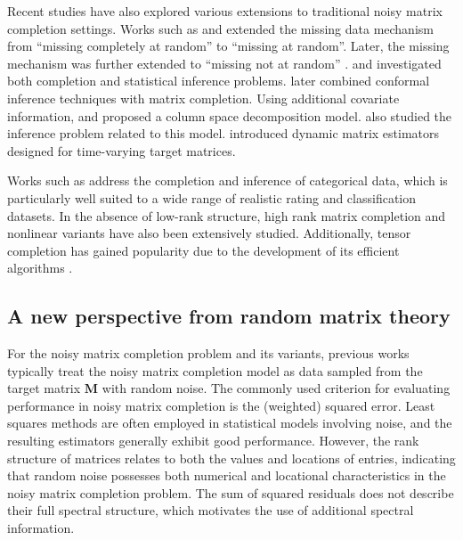 \documentclass[numsec,webpdf,modern,large,namedate]{oup-authoring-template}
\theoremstyle{plain}
\theoremstyle{remark}
\newcommand{\M}{\bm{M}}
\begin{document}
Recent studies have also explored various extensions to traditional noisy matrix completion settings. Works such as \cite{klopp2014noisy} and \cite{bi2017group} extended the missing data mechanism from ``missing completely at random''  to ``missing at random''.
Later, the missing mechanism was further extended to ``missing not at random'' \citep{bhattacharya2022matrix,choi2023matrix}.  \cite{chen2019inference} and \cite{xia2021statistical} investigated both completion and statistical inference problems. \cite{gui2023conformalized} later combined conformal inference techniques with matrix completion. Using additional covariate information, \cite{mao2019matrix} and \cite{jin2022matrix} proposed a column space decomposition model. \cite{ma2024statistical} also studied the inference problem related to this model.
\cite{chen2024dynamic} introduced dynamic matrix estimators designed for time-varying target matrices.

Works such as \cite{cai2013max,davenport20141,chen2024note} address the completion and inference of categorical data, which is particularly well suited to a wide range of realistic rating and classification datasets.
In the absence of low-rank structure, high rank matrix completion \citep{elhamifar2016high} and nonlinear variants \citep{fan2017deep} have also been extensively studied. Additionally, tensor completion has gained popularity due to the development of its efficient algorithms \citep{zhang2020islet,luo2023low}.

\subsection{A new perspective from random matrix theory}
For the noisy matrix completion problem and its variants, previous works typically treat the noisy matrix completion model as data sampled from the target matrix $\M$ with random noise. The commonly used criterion for evaluating performance in noisy matrix completion is the (weighted) squared error. Least squares methods are often employed in statistical models involving noise, and the resulting estimators generally exhibit good performance. However, the rank structure of matrices relates to both the values and locations of entries, indicating that random noise possesses both numerical and locational characteristics in the noisy matrix completion problem. The sum of squared residuals does not describe their full spectral structure, which motivates the use of additional spectral information.
\end{document}
